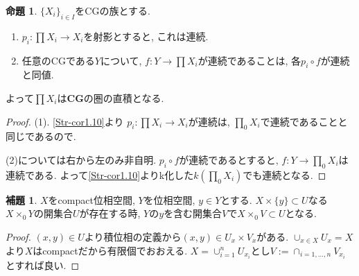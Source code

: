 \documentclass[dvipdfmx,a4paper,11pt]{article}
\theoremstyle{definition}
\newtheorem{lem}[thm]{補題}
\newtheorem{prop}[thm]{命題}
\begin{document}
 \begin{tcolorbox}
 [colback = white, colframe = green!35!black, fonttitle = \bfseries,breakable = true]
\begin{prop}\cite[Prop2.4]{Str}
$\{ X_i \}_{i \in I}$をCGの族とする.
\begin{enumerate}
\item $p_i : \prod X_i \to X_i$を射影とすると, これは連続.
\item 任意のCGである$Y$について, $f : Y \to \prod X_i $が連続であることは, 各$p_i \circ f $が連続と同値.
\end{enumerate}
よって$\prod X_i$は{\bf CG}の圏の直積となる.
\end{prop}
\end{tcolorbox}

\begin{proof}
(1). \ref{Str-cor1.10}より
$p_i : \prod X_i \to X_i$が連続は, $\prod_0 X_i$で連続であることと同じであるので.

(2)については右から左のみ非自明. 
$p_i \circ f $が連続であるとすると, $f : Y \to \prod_0 X_i $は連続である.
よって\ref{Str-cor1.10}よりk化した$k(\prod_0 X_i)$でも連続となる. 
\end{proof}

 \begin{tcolorbox}
 [colback = white, colframe = green!35!black, fonttitle = \bfseries,breakable = true]
\begin{lem}\cite[Lem 2.5]{Str}
\label{Str-lem2.5}
$X$をcompact位相空間, $Y$を位相空間, $y \in Y$とする.
$X \times \{ y\} \subset U$なる$X \times_0 Y$の開集合$U$が存在する時,
$Y$の$y$を含む開集合$V$で$X \times_{0} V \subset U$となる.
\end{lem}
\end{tcolorbox}

\begin{proof}
$(x,y ) \in U$より積位相の定義から$(x,y) \in U_x \times V_x$がある.
$\cup_{x \in X} U_x  = X$より$X$はcompactだから有限個でおおえる.
$X = \cup_{i=1}^{n} U_{x_i}$とし$V:= \cap_{i=1,\ldots, n} V_{x_i}$とすれば良い. 
\end{proof}
\end{document}
